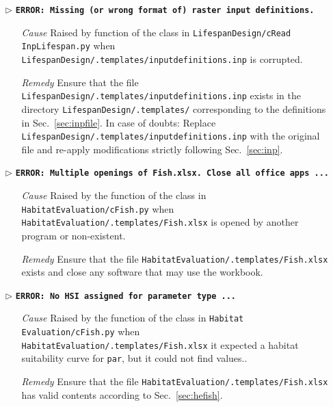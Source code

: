 \begin{itemize}
	\item[$\triangleright$]\textbf{\texttt{ERROR: Missing (or wrong format of) raster input definitions.}}
	\begin{itemize}
		\item[\textit{Cause}\hspace{0.27cm}] Raised by  function of the  class in \texttt{LifespanDesign/cRead InpLifespan.py} when \\ \texttt{LifespanDesign/.templates/input{\myUnderscore}definitions.inp} is corrupted.
		\item[\textit{Remedy}] Ensure that the file \texttt{LifespanDesign/.templates/input{\myUnderscore}definitions.inp} exists in the directory \texttt{LifespanDesign/.templates/} corresponding to the definitions in Sec.~\ref{sec:inpfile}. In case of doubts: Replace \texttt{LifespanDesign/.templates/input{\myUnderscore}definitions.inp} with the original file and re-apply modifications strictly following Sec.~\ref{sec:inp}.\\
	\end{itemize}
	
	\item[$\triangleright$]\textbf{\texttt{ERROR: Multiple openings of Fish.xlsx. Close all office apps ...}}
	\begin{itemize}
		\item[\textit{Cause}\hspace{0.27cm}] Raised by the  function of the  class in \texttt{HabitatEvaluation/cFish.py} when \\ \texttt{HabitatEvaluation/.templates/Fish.xlsx} is opened by another program or non-existent.
		\item[\textit{Remedy}] Ensure that the file \texttt{HabitatEvaluation/.templates/Fish.xlsx} exists and close any software that may use the workbook.\\
	\end{itemize}
	
	\item[$\triangleright$]\textbf{\texttt{ERROR: No HSI assigned for parameter type ...}}
	\begin{itemize}
		\item[\textit{Cause}\hspace{0.27cm}] Raised by the  function of the  class in \texttt{Habitat Evaluation/cFish.py} when \\ \texttt{HabitatEvaluation/.templates/Fish.xlsx} it expected a habitat suitability curve for \texttt{par}, but it could not find values..
		\item[\textit{Remedy}] Ensure that the file \texttt{HabitatEvaluation/.templates/Fish.xlsx} has valid contents according to Sec.~\ref{sec:hefish}.\\
	\end{itemize}
	

\end{itemize}
